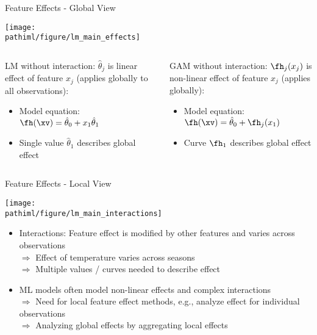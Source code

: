 \documentclass[11pt,compress,t,notes=noshow, aspectratio=169, xcolor=table]{beamer}
\newcommand{\pathiml}{../../slides/03_feature-effects/}
\begin{document}
\begin{frame}{Feature Effects - Global View}

\centering

\texttt{[image: \\pathiml/figure/lm\_main\_effects]}

\begin{columns}[T, totalwidth=\linewidth]
\begin{column}{0.49\linewidth}
LM without interaction: $\hat\theta_j$ is linear effect of feature $x_j$ (applies globally to all observations):
\begin{itemize}
    \item Model equation: $\fh(\xv) = \hat\theta_0 + x_1\hat\theta_1$
    \item Single value $\hat\theta_1$ describes global effect
\end{itemize}
\end{column}\pause
\begin{column}{0.49\linewidth}
GAM without interaction: $\fh_j(x_j)$ is non-linear effect of feature $x_j$  (applies globally):
\begin{itemize}
    \item Model equation: $\fh(\xv) = \hat\theta_0 + \fh_j(x_1)$
    \item Curve $\fh_1$ describes global effect
\end{itemize}
\end{column}
\end{columns}

\end{frame}


\begin{frame}{Feature Effects - Local View}

\centerline{\texttt{[image: \\pathiml/figure/lm\_main\_interactions]}}

\begin{itemize}
    \item Interactions: Feature effect is modified by other features and varies across observations \\ 
    $\Rightarrow$ Effect of temperature varies across seasons\\
    $\Rightarrow$ Multiple values / curves needed to describe effect
    \item ML models often model non-linear effects and complex interactions \\
    $\Rightarrow$ Need for local feature effect methods, e.g., analyze effect for individual observations\\
    $\Rightarrow$ Analyzing global effects by aggregating local effects
\end{itemize}




\end{frame}
\end{document}
